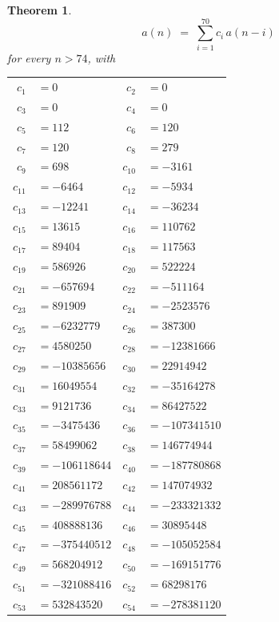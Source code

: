 \documentclass[11pt,a4paper]{article}
\theoremstyle{plain}
\newtheorem{theorem}{Theorem}
\theoremstyle{definition}
\begin{document}
\begin{theorem}
\[
a(n)\;=\;\sum_{i=1}^{70}c_i\,a(n-i)
\]
for every $n>74$, with
\begin{center}\footnotesize
\begin{tabular}{r@{\,}l@{\qquad}r@{\,}l}
$c_{1}$ & $=0$ & $c_{2}$ & $=0$ \\
$c_{3}$ & $=0$ & $c_{4}$ & $=0$ \\
$c_{5}$ & $=112$ & $c_{6}$ & $=120$ \\
$c_{7}$ & $=120$ & $c_{8}$ & $=279$ \\
$c_{9}$ & $=698$ & $c_{10}$ & $=-3161$ \\
$c_{11}$ & $=-6464$ & $c_{12}$ & $=-5934$ \\
$c_{13}$ & $=-12241$ & $c_{14}$ & $=-36234$ \\
$c_{15}$ & $=13615$ & $c_{16}$ & $=110762$ \\
$c_{17}$ & $=89404$ & $c_{18}$ & $=117563$ \\
$c_{19}$ & $=586926$ & $c_{20}$ & $=522224$ \\
$c_{21}$ & $=-657694$ & $c_{22}$ & $=-511164$ \\
$c_{23}$ & $=891909$ & $c_{24}$ & $=-2523576$ \\
$c_{25}$ & $=-6232779$ & $c_{26}$ & $=387300$ \\
$c_{27}$ & $=4580250$ & $c_{28}$ & $=-12381666$ \\
$c_{29}$ & $=-10385656$ & $c_{30}$ & $=22914942$ \\
$c_{31}$ & $=16049554$ & $c_{32}$ & $=-35164278$ \\
$c_{33}$ & $=9121736$ & $c_{34}$ & $=86427522$ \\
$c_{35}$ & $=-3475436$ & $c_{36}$ & $=-107341510$ \\
$c_{37}$ & $=58499062$ & $c_{38}$ & $=146774944$ \\
$c_{39}$ & $=-106118644$ & $c_{40}$ & $=-187780868$ \\
$c_{41}$ & $=208561172$ & $c_{42}$ & $=147074932$ \\
$c_{43}$ & $=-289976788$ & $c_{44}$ & $=-233321332$ \\
$c_{45}$ & $=408888136$ & $c_{46}$ & $=30895448$ \\
$c_{47}$ & $=-375440512$ & $c_{48}$ & $=-105052584$ \\
$c_{49}$ & $=568204912$ & $c_{50}$ & $=-169151776$ \\
$c_{51}$ & $=-321088416$ & $c_{52}$ & $=68298176$ \\
$c_{53}$ & $=532843520$ & $c_{54}$ & $=-278381120$ \\

\end{tabular}
\end{center}
\end{theorem}
\end{document}
